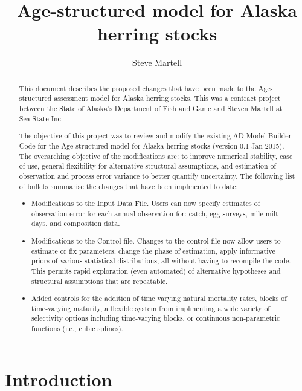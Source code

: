 \documentclass[12pt,letterpaper]{article}
\title{Age-structured model for Alaska herring stocks}
\author{Steve Martell}
\begin{document}
  \maketitle
  \renewcommand{\abstractname}{Executive Summary}
  \begin{abstract}
    This document describes the proposed changes that have been made to the Age-structured assessment model for Alaska herring stocks. This was a contract project between the State of Alaska's Department of Fish and Game and Steven Martell at Sea State Inc.

    The objective of this project was to review and modify the existing AD Model Builder Code for the Age-structured model for Alaska herring stocks (version 0.1 Jan 2015).  The overarching objective of the modifications are:  to improve numerical stability, ease of use, general flexibility for alternative structural assumptions, and estimation of observation and process error variance to better quantify uncertainty. The following list of bullets summarise the changes that have been implmented to date:

    \begin{itemize}
      \item Modifications to the Input Data File.  Users can now specify estimates of observation error for each annual observation for: catch, egg surveys, mile milt days, and composition data.
      \item Modifications to the Control file.  Changes to the control file now allow users to estimate or fix parameters, change the phase of estimation, apply informative priors of various statistical distributions, all without having to recompile the code.  This permits rapid exploration (even automated) of alternative hypotheses and structural assumptions that are repeatable.
      \item Added controls for the addition of time varying natural mortality rates, blocks of time-varying maturity, a flexible system from implmenting a wide variety of selectivity options including time-varying blocks, or continuous non-parametric functions (i.e., cubic splines).
    \end{itemize}

  \end{abstract}


  \section{Introduction} %
  \label{sec:introduction}
\end{document}
